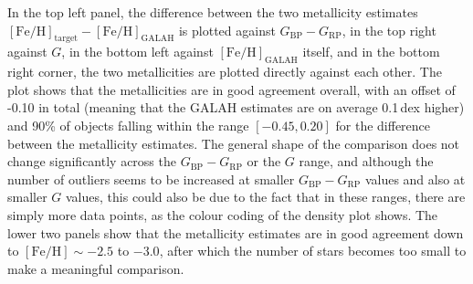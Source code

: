 \documentclass[a4paper,11pt]{article}
\begin{document}
%
In the top left panel, the difference between the two metallicity estimates $\mathrm{[Fe/H]_{target}}-\mathrm{[Fe/H]_{GALAH}}$ is plotted against $G_\mathrm{BP}-G_\mathrm{RP}$, in the top right against $G$, in the bottom left against $\mathrm{[Fe/H]_{GALAH}}$ itself, and in the bottom right corner, the two metallicities are plotted directly against each other. The plot shows that the metallicities are in good agreement overall, with an offset of -0.10 in total (meaning that the GALAH estimates are on average 0.1\,dex higher) and 90\% of objects falling within the range $[-0.45,0.20]$ for the difference between the metallicity estimates. The general shape of the comparison does not change significantly across the $G_\mathrm{BP}-G_\mathrm{RP}$ or the $G$ range, and although the number of outliers seems to be increased at smaller $G_\mathrm{BP}-G_\mathrm{RP}$ values and also at smaller $G$ values, this could also be due to the fact that in these ranges, there are simply more data points, as the colour coding of the density plot shows. The lower two panels show that the metallicity estimates are in good agreement down to $\mathrm{[Fe/H]}\sim-2.5$ to $-3.0$, after which the number of stars becomes too small to make a meaningful comparison.
%
\end{document}
